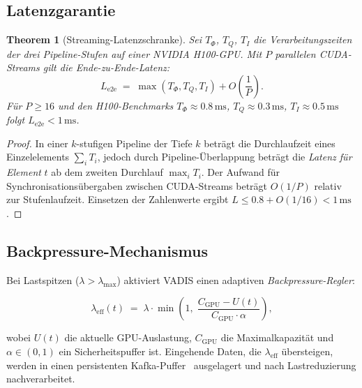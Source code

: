 ﻿\documentclass[12pt,a4paper]{article}
\newtheorem{theorem}{Theorem}[section]
\begin{document}
\subsection{Latenzgarantie}

\begin{theorem}[Streaming-Latenzschranke]
\label{thm:latency}
Sei $T_\Phi$, $T_Q$, $T_I$ die Verarbeitungszeiten der drei
Pipeline-Stufen auf einer NVIDIA H100-GPU. Mit $P$ parallelen
CUDA-Streams gilt die Ende-zu-Ende-Latenz:
\[
  L_{\text{e2e}} \;=\; \max(T_\Phi, T_Q, T_I) + O\!\left(\frac{1}{P}\right).
\]
Für $P \geq 16$ und den H100-Benchmarks
$T_\Phi \approx 0.8\,\mathrm{ms}$, $T_Q \approx 0.3\,\mathrm{ms}$,
$T_I \approx 0.5\,\mathrm{ms}$ folgt $L_{\text{e2e}} < 1\,\mathrm{ms}$.
\end{theorem}

\begin{proof}
In einer $k$-stufigen Pipeline der Tiefe $k$ beträgt die
Durchlaufzeit eines Einzelelements $\sum_i T_i$, jedoch durch
Pipeline-Überlappung beträgt die \emph{Latenz für Element}
$t$ ab dem zweiten Durchlauf $\max_i T_i$. Der Aufwand für
Synchronisationsübergaben zwischen CUDA-Streams beträgt
$O(1/P)$ relativ zur Stufenlaufzeit. Einsetzen der Zahlenwerte
ergibt $L \leq 0.8 + O(1/16) < 1\,\mathrm{ms}$.
\end{proof}

\subsection{Backpressure-Mechanismus}

Bei Lastspitzen ($\lambda > \lambda_{\max}$) aktiviert VADIS
einen adaptiven \emph{Backpressure-Regler}:

\begin{equation}
  \lambda_{\text{eff}}(t) \;=\; \lambda \cdot \min\!\left(1,\;
  \frac{C_{\text{GPU}} - U(t)}{C_{\text{GPU}} \cdot \alpha}\right),
\end{equation}

wobei $U(t)$ die aktuelle GPU-Auslastung, $C_{\text{GPU}}$ die
Maximalkapazität und $\alpha \in (0,1)$ ein Sicherheitspuffer ist.
Eingehende Daten, die $\lambda_{\text{eff}}$ übersteigen, werden
in einen persistenten Kafka-Puffer~\cite{kreps2011kafka} ausgelagert
und nach Lastreduzierung nachverarbeitet.

\end{document}
